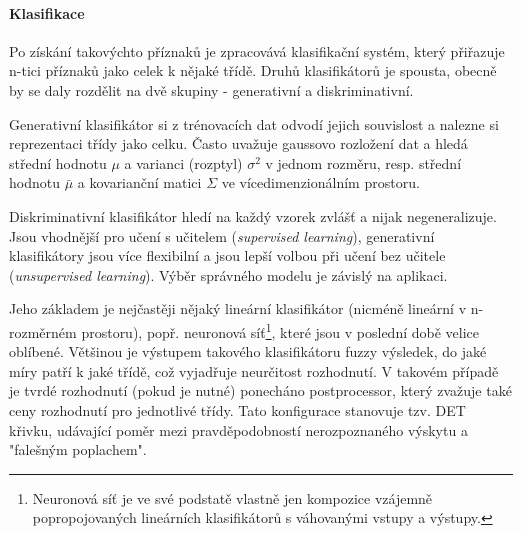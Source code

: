 \documentclass[10pt,a4paper,titlepage]{article}
\begin{document}
  \paragraph{Klasifikace}
  Po získání takovýchto příznaků je zpracovává klasifikační systém, který přiřazuje n-tici příznaků
  jako celek k nějaké třídě. Druhů klasifikátorů je spousta, obecně by se daly rozdělit na dvě
  skupiny - generativní a diskriminativní.
  
  Generativní klasifikátor si z trénovacích dat odvodí jejich souvislost a nalezne si reprezentaci
  třídy jako celku. Často uvažuje gaussovo rozložení dat a hledá střední hodnotu $\mu$ a varianci (rozptyl)
  $\sigma^2$ v jednom rozměru, resp. střední hodnotu $\bar{\mu}$ a kovarianční matici $\Sigma$ ve
  vícedimenzionálním prostoru.
  
  Diskriminativní klasifikátor hledí na každý vzorek zvlášť a nijak negeneralizuje. Jsou vhodnější
  pro učení s učitelem ({\it supervised learning}), generativní klasifikátory jsou více flexibilní
  a jsou lepší volbou při učení bez učitele ({\it unsupervised learning}). Výběr správného
  modelu je závislý na aplikaci.


  Jeho základem je nejčastěji nějaký lineární klasifikátor (nicméně lineární v n-rozměrném prostoru),
  popř. neuronová síť\footnote{Neuronová síť je ve své podstatě vlastně jen kompozice vzájemně
  popropojovaných lineárních klasifikátorů s váhovanými vstupy a výstupy.}, které jsou v poslední době
  velice oblíbené. Většinou je výstupem takového klasifikátoru fuzzy výsledek, do jaké míry patří k
  jaké třídě, což vyjadřuje neurčitost rozhodnutí. V takovém případě je tvrdé rozhodnutí (pokud je nutné)
  ponecháno postprocessor, který zvažuje také ceny rozhodnutí pro jednotlivé třídy. Tato konfigurace
  stanovuje tzv. DET křivku, udávající poměr mezi pravděpodobností nerozpoznaného výskytu a
  "falešným poplachem". \cite{IKRclassification}
\end{document}
